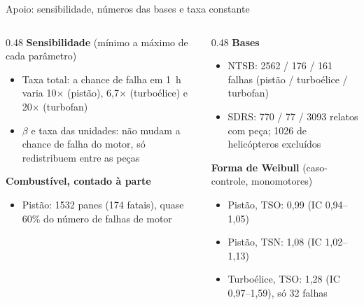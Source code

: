 \documentclass[aspectratio=169,11pt]{beamer}
\begin{document}
\appendix
\begin{frame}{Apoio: sensibilidade, números das bases e taxa constante}
  \small
  \begin{columns}[T]
    \begin{column}{0.48\textwidth}
      \textbf{Sensibilidade} (mínimo a máximo de cada parâmetro)
      \begin{itemize}
        \item Taxa total: a chance de falha em 1~h varia 10$\times$ (pistão), 6,7$\times$ (turboélice) e 20$\times$ (turbofan)
        \item $\beta$ e taxa das unidades: não mudam a chance de falha do motor, só redistribuem entre as peças
      \end{itemize}
      \textbf{Combustível, contado à parte}
      \begin{itemize}
        \item Pistão: 1532 panes (174 fatais), quase 60\% do número de falhas de motor
      \end{itemize}
    \end{column}
    \begin{column}{0.48\textwidth}
      \textbf{Bases}
      \begin{itemize}
        \item NTSB: 2562 / 176 / 161 falhas (pistão / turboélice / turbofan)
        \item SDRS: 770 / 77 / 3093 relatos com peça; 1026 de helicópteros excluídos
      \end{itemize}
      \textbf{Forma de Weibull} (caso-controle, monomotores)
      \begin{itemize}
        \item Pistão, TSO: 0,99 (IC 0,94--1,05)
        \item Pistão, TSN: 1,08 (IC 1,02--1,13)
        \item Turboélice, TSO: 1,28 (IC 0,97--1,59), só 32 falhas
      \end{itemize}
    \end{column}
  \end{columns}
\end{frame}
\end{document}
